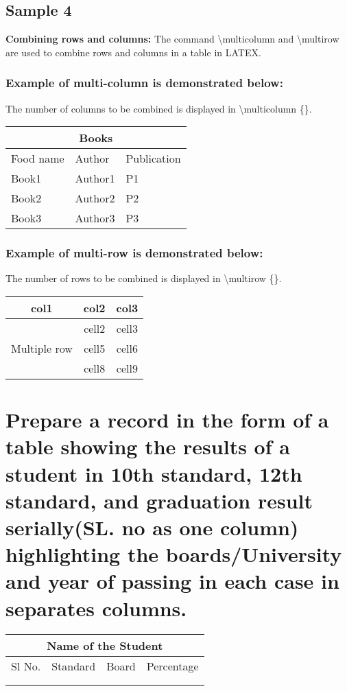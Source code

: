 \documentclass{article}
\begin{document}
\subsection{Sample 4}
\textbf{Combining rows and columns:}
The command \textbackslash multicolumn and \textbackslash multirow are used to combine rows 
and columns in a table in LATEX.
\subsubsection{Example of multi-column is demonstrated below:}
The number of columns to be combined is displayed in \textbackslash multicolumn \{\}.
\begin{center} \begin{tabular}{ |p{2cm}|p{2cm}|p{2cm}| }
\hline
\multicolumn{3}{|c|}{Books} \\
\hline
Food name& Author &Publication\\
\hline
Book1 & Author1 &P1\\
Book2 & Author2 & P2\\
Book3 & Author3 & P3\\
\hline
\end{tabular} \end{center}
\subsubsection{Example of multi-row is demonstrated below:}
The number of rows to be combined is displayed in \textbackslash multirow \{\}.
\begin{center}
\begin{tabular}{ |c|c|c| } 
\hline
col1 & col2 & col3 \\
\hline
\multirow{3}{4em}{Multiple row} & cell2 & cell3 \\
& cell5 & cell6 \\
& cell8 & cell9 \\
\hline
\end{tabular}
\end{center}
\section{Prepare a record in the form of a table showing the results of a student in 10th standard, 
12th standard, and graduation result serially(SL. no as one column) highlighting the 
boards/University and year of passing in each case in separates columns.}
\begin{center}
 \begin{tabular}{ |p{2cm}|p{2cm}|p{2cm}|p{2cm}| }
 \hline
 \multicolumn{4}{|c|}{Name of the Student} \\
 \hline
 Sl No.& Standard & Board & Percentage\\
 \hline
 & & &\\
 & & &\\
 \hline
\end{tabular}
\end{center}
\end{document}
